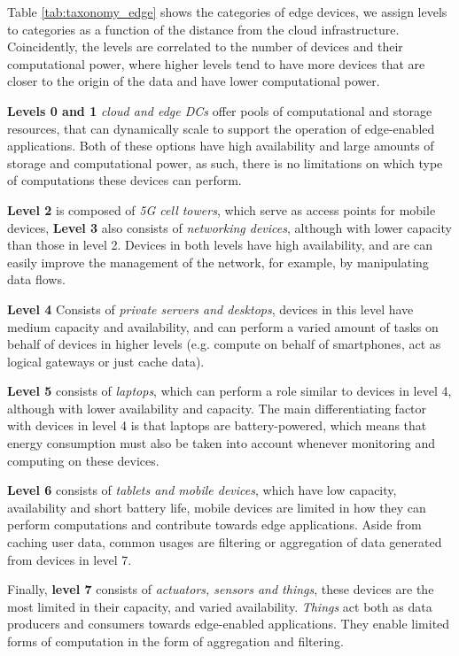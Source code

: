 Table \ref{tab:taxonomy_edge} shows the categories of edge devices, we assign levels to categories as a function of the distance from the cloud infrastructure. Coincidently, the levels are correlated to the number of devices and their computational power, where higher levels tend to have more devices that are closer to the origin of the data and have lower computational power.

\textbf{Levels 0 and 1} \textit{cloud and edge DCs} offer pools of computational and storage resources, that can dynamically scale to support the operation of edge-enabled applications. Both of these options have high availability and large amounts of storage and computational power, as such, there is no limitations on which type of computations these devices can perform.

\textbf{Level 2} is composed of \textit{5G cell towers}, which serve as access points for mobile devices, \textbf{Level 3} also consists of \textit{networking devices}, although with lower capacity than those in level 2. Devices in both levels have high availability, and are can easily improve the management of the network, for example, by manipulating data flows.

\textbf{Level 4} Consists of \textit{private servers and desktops}, devices in this level have medium capacity and availability, and can perform a varied amount of tasks on behalf of devices in higher levels (e.g. compute on behalf of smartphones, act as logical gateways or just cache data). 

\textbf{Level 5} consists of \textit{laptops}, which can perform a role similar to devices in level 4, although with lower availability and capacity. The main differentiating factor with devices in level 4 is that laptops are battery-powered, which means that energy consumption must also be taken into account whenever monitoring and computing on these devices. 

\textbf{Level 6} consists of \textit{tablets and mobile devices}, which have low capacity, availability and short battery life, mobile devices are limited in how they can perform computations and contribute towards edge applications. Aside from caching user data, common usages are filtering or aggregation of data generated from devices in level 7. 

Finally, \textbf{level 7} consists of \textit{actuators, sensors and things}, these devices are the most limited in their capacity, and varied availability. \textit{Things} act both as data producers and consumers towards edge-enabled applications. They enable limited forms of computation in the form of aggregation and filtering.


